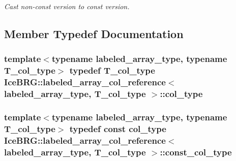 \begin{DoxyCompactItemize}
\begin{DoxyCompactList}\small\item\em Cast non-\/const version to const version. \end{DoxyCompactList}\end{DoxyCompactItemize}


\subsection{Member Typedef Documentation}
\hypertarget{classIceBRG_1_1labeled__array__col__reference_ad55f27046974468dea6e20647571e4e0}{}
\subsubsection[{col\+\_\+type}]{\setlength{\rightskip}{0pt plus 5cm}template$<$typename labeled\+\_\+array\+\_\+type, typename T\+\_\+col\+\_\+type$>$ typedef T\+\_\+col\+\_\+type {\bf Ice\+B\+R\+G\+::labeled\+\_\+array\+\_\+col\+\_\+reference}$<$ labeled\+\_\+array\+\_\+type, T\+\_\+col\+\_\+type $>$\+::{\bf col\+\_\+type}}\label{classIceBRG_1_1labeled__array__col__reference_ad55f27046974468dea6e20647571e4e0}
\hypertarget{classIceBRG_1_1labeled__array__col__reference_a00d71fc36336ea5879c401a111ac53f4}{}
\subsubsection[{const\+\_\+col\+\_\+type}]{\setlength{\rightskip}{0pt plus 5cm}template$<$typename labeled\+\_\+array\+\_\+type, typename T\+\_\+col\+\_\+type$>$ typedef const {\bf col\+\_\+type} {\bf Ice\+B\+R\+G\+::labeled\+\_\+array\+\_\+col\+\_\+reference}$<$ labeled\+\_\+array\+\_\+type, T\+\_\+col\+\_\+type $>$\+::{\bf const\+\_\+col\+\_\+type}}\label{classIceBRG_1_1labeled__array__col__reference_a00d71fc36336ea5879c401a111ac53f4}
\hypertarget{classIceBRG_1_1labeled__array__col__reference_ab7d7f397a1e5f1d9bfc2c61604dda841}{}
